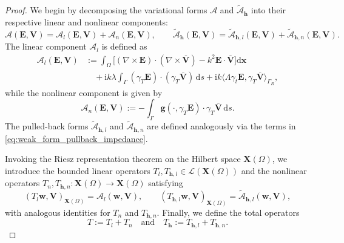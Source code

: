 \documentclass[10pt,a4paper]{amsart}
\numberwithin{equation}{section}
\begin{document}
\begin{proof}
We begin by decomposing the variational forms $\mathcal{A}$ and $\widetilde{\mathcal{A}}_{\mathbf{h}}$ into their respective linear and nonlinear components:
\[
\mathcal{A}(\mathbf{E}, \mathbf{V}) = \mathcal{A}_l(\mathbf{E}, \mathbf{V}) + \mathcal{A}_n(\mathbf{E}, \mathbf{V}), \qquad \widetilde{\mathcal{A}}_{\mathbf{h}}(\mathbf{E}, \mathbf{V}) = \widetilde{\mathcal{A}}_{\mathbf{h},l}(\mathbf{E}, \mathbf{V}) + \widetilde{\mathcal{A}}_{\mathbf{h},n}(\mathbf{E}, \mathbf{V}).
\]
The linear component $\mathcal{A}_l$ is defined as
\begin{align*}
\mathcal{A}_l(\mathbf{E}, \mathbf{V}) &:= \int_\Omega \Big[ (\nabla \times \mathbf{E}) \cdot (\nabla \times \overline{\mathbf{V}}) - k^2 \mathbf{E} \cdot \overline{\mathbf{V}} \Big] \mathrm{d}\boldsymbol{x} \\
&\quad + \mathrm{i} k \lambda \int_\Gamma (\gamma_T \mathbf{E}) \cdot (\gamma_T \overline{\mathbf{V}}) \,\mathrm{d}s + \mathrm{i} k \langle \Lambda \gamma_t \mathbf{E}, \gamma_T \overline{\mathbf{V}} \rangle_{\Gamma_R},
\end{align*}
while the nonlinear component is given by
\[
\mathcal{A}_n(\mathbf{E}, \mathbf{V}) := - \int_\Gamma \mathbf{g}(\cdot, \gamma_T \mathbf{E}) \cdot \gamma_T \overline{\mathbf{V}} \,\mathrm{d}s.
\]
The pulled-back forms $\widetilde{\mathcal{A}}_{\mathbf{h},l}$ and $\widetilde{\mathcal{A}}_{\mathbf{h},n}$ are defined analogously via the terms in \eqref{eq:weak_form_pullback_impedance}.

Invoking the Riesz representation theorem on the Hilbert space $\mathbf{X}(\Omega)$, we introduce the bounded linear operators $T_l, T_{\mathbf{h},l} \in \mathcal{L}(\mathbf{X}(\Omega))$ and the nonlinear operators $T_n, T_{\mathbf{h},n} : \mathbf{X}(\Omega) \to \mathbf{X}(\Omega)$ satisfying
\[
(T_l \mathbf{w}, \mathbf{V})_{\mathbf{X}(\Omega)} = \mathcal{A}_l(\mathbf{w}, \mathbf{V}), \qquad (T_{\mathbf{h},l} \mathbf{w}, \mathbf{V})_{\mathbf{X}(\Omega)} = \widetilde{\mathcal{A}}_{\mathbf{h},l}(\mathbf{w}, \mathbf{V}),
\]
with analogous identities for $T_n$ and $T_{\mathbf{h},n}$. Finally, we define the total operators
\[
T := T_l + T_n \quad \text{and} \quad T_{\mathbf{h}} := T_{\mathbf{h},l} + T_{\mathbf{h},n}.
\]



\end{proof}
\end{document}
